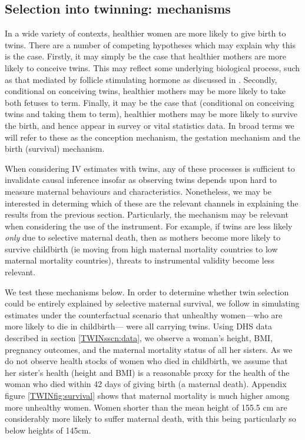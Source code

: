 \documentclass[subeqn]{article}
\begin{document}
\begin{spacing}{1.4}
\subsection{Selection into twinning: mechanisms}   \label{TWINsscn:selection}
In a wide variety of contexts, healthier women are more likely to give birth to
twins.  There are a number of competing hypotheses which may explain why this is
the case.  Firstly, it may simply be the case that healthier mothers are more 
likely to conceive twins.  This may reflect some underlying biological process, 
such as that mediated by follicle stimulating hormone as discussed in 
\citet{Hall2003}.  Secondly, conditional on conceiving twins, healthier mothers 
may be more likely to take both fetuses to term.  Finally, it may be the case 
that (conditional on conceiving twins and taking them to term), healthier mothers 
may be more likely to survive the birth, and hence appear in survey or vital 
statistics data.  In broad terms we will refer to these as the conception 
mechanism, the gestation mechanism and the birth (survival) mechanism.

When considering IV estimates with twins, any of these processes is sufficient 
to invalidate causal inference insofar as observing twins depends upon hard 
to measure maternal behaviours and characteristics.  Nonetheless, we may be 
interested in determing which of these are the relevant channels in explaining 
the results from the previous section.  Particularly, the mechanism may be 
relevant when considering the use of the instrument.  For example, if twins are 
less likely \emph{only} due to selective maternal death, then as mothers become 
more likely to survive childbirth (ie moving from high maternal mortality 
countries to low maternal mortality countries), threats to instrumental validity 
become less relevant.

We test these mechanisms below.  In order to determine whether twin selection
could be entirely explained by selective maternal survival, we follow 
\citet{Aldermanetal2011} in simulating estimates under the counterfactual 
scenario that unhealthy women---who are more likely to die in childbirth---%
were all carrying twins.  Using DHS data described in section \ref{TWINsscn:data},
we observe a woman's height, BMI, pregnancy outcomes, and the maternal mortality
status of all her sisters.  As we do not observe health stocks of women who died
in childbirth, we assume that her sister's health (height and BMI) is a reasonable 
proxy for the health of the woman who died within 42 days of giving birth (a 
maternal death).  Appendix figure \ref{TWINfig:survival} shows that maternal 
mortality is much higher among more unhealthy women.  Women shorter than the mean 
height of 155.5 cm are considerably more likely to suffer maternal death, with this 
being particularly so below heights of 145cm.


\end{spacing}
\end{document}
